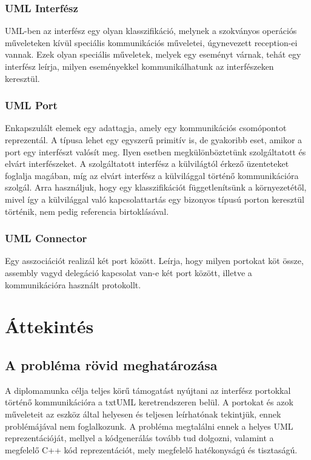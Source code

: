 \documentclass[a4paper,12pt]{report}
\begin{document}
\subsection{UML Interfész}
UML-ben az interfész egy olyan klasszifikáció, melynek a szokványos operációs műveleteken kívül speciális kommunikációs műveletei, úgynevezett reception-ei vannak. Ezek olyan speciális műveletek, melyek egy eseményt várnak, tehát egy interfész leírja, milyen eseményekkel kommunikálhatunk az interfészeken keresztül.
\subsection{UML Port}
Enkapszulált elemek egy adattagja, amely egy kommunikációs csomópontot reprezentál. A típusa lehet egy egyszerű primitív is, de gyakoribb eset, amikor a port egy interfészt valósít meg. Ilyen esetben megkülönböztetünk szolgáltatott és elvárt interfészeket. A szolgáltatott interfész a külvilágtól érkező üzenteteket foglalja magában, míg az elvárt interfész a külvilággal történő kommunikációra szolgál. Arra használjuk, hogy egy klasszifikációt függetlenítsünk a környezetétől, mivel így a külvilággal való kapcsolattartás egy bizonyos típusú porton keresztül történik, nem pedig referencia birtoklásával.
\subsection{UML Connector}
Egy asszociációt realizál két port között. Leírja, hogy milyen portokat köt össze, assembly vagyd delegáció kapcsolat van-e két port között, illetve a kommunikációra használt protokollt.

\chapter{Áttekintés}

\section{A probléma rövid meghatározása}
A diplomamunka célja teljes körű támogatást nyújtani az interfész portokkal történő kommunikációra a txtUML keretrendszeren belül. A portokat és azok műveleteit az eszköz által helyesen és teljesen leírhatónak tekintjük, ennek problémájával nem foglalkozunk. A probléma megtalálni ennek a helyes UML reprezentációját, mellyel a kódgenerálás tovább tud dolgozni, valamint a megfelelő C++ kód reprezentációt, mely megfelelő hatékonyságú és tisztaságú.
\end{document}
